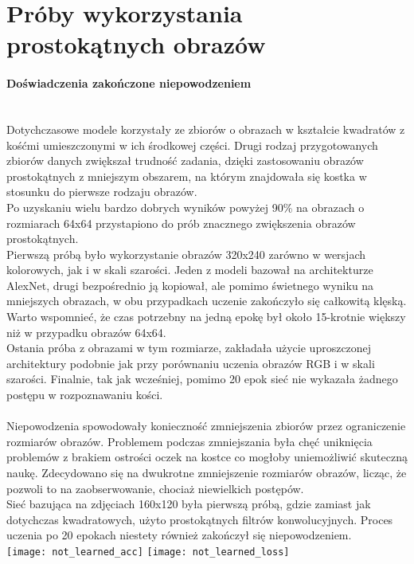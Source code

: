 \section{Próby wykorzystania prostokątnych obrazów}
\paragraph{Doświadczenia zakończone niepowodzeniem} \mbox{}\\
Dotychczasowe modele korzystały ze zbiorów o obrazach w kształcie kwadratów z kośćmi
umieszczonymi w ich środkowej części. Drugi rodzaj przygotowanych zbiorów danych zwiększał
trudność zadania, dzięki zastosowaniu obrazów prostokątnych z mniejszym obszarem, na którym znajdowała się kostka w stosunku do pierwsze rodzaju obrazów.\\
Po uzyskaniu wielu bardzo dobrych wyników powyżej 90\% na obrazach o rozmiarach 64x64
przystapiono do prób znacznego zwiększenia obrazów prostokątnych.\\
Pierwszą próbą było wykorzystanie obrazów 320x240 zarówno w wersjach kolorowych, jak i w skali szarości. Jeden z modeli bazował na architekturze AlexNet, drugi bezpośrednio
ją kopiował, ale pomimo świetnego wyniku na mniejszych obrazach, w obu przypadkach
uczenie zakończyło się całkowitą klęską. Warto wspomnieć, że czas potrzebny na
jedną epokę był około 15-krotnie większy niż w przypadku obrazów 64x64.\\
Ostania próba z obrazami w tym rozmiarze, zakładała użycie uproszczonej architektury
podobnie jak przy porównaniu uczenia obrazów RGB i w skali szarości. Finalnie, tak jak
wcześniej, pomimo 20 epok sieć nie wykazała żadnego postępu w rozpoznawaniu kości.\\\\
Niepowodzenia spowodowały konieczność zmniejszenia zbiorów przez ograniczenie rozmiarów obrazów.
Problemem podczas zmniejszania była chęć uniknięcia problemów z brakiem ostrości
oczek na kostce co mogłoby uniemożliwić skuteczną naukę. Zdecydowano się na dwukrotne
zmniejszenie rozmiarów obrazów, licząc, że pozwoli to na zaobserwowanie, chociaż niewielkich
postępów.\\
Sieć bazująca na zdjęciach 160x120 była pierwszą próbą, gdzie zamiast jak dotychczas
kwadratowych, użyto prostokątnych filtrów konwolucyjnych. Proces uczenia po 20 epokach
niestety również zakończył się niepowodzeniem.\\
\texttt{[image: not\_learned\_acc]}
\texttt{[image: not\_learned\_loss]}


